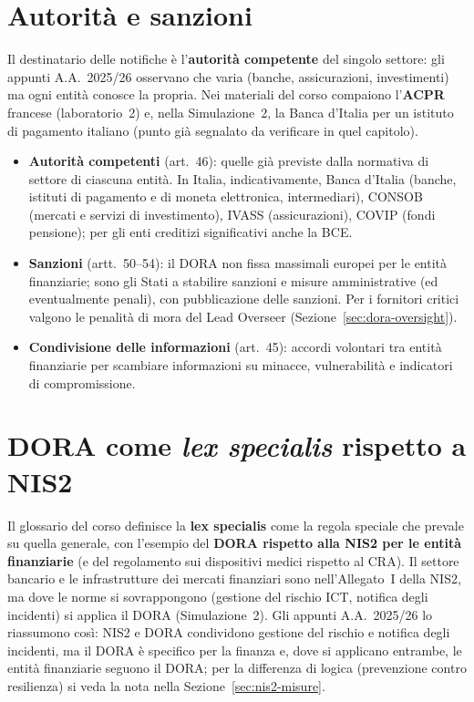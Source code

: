 \section{Autorità e sanzioni}
\label{sec:dora-autorita}

Il destinatario delle notifiche è l'\textbf{autorità competente} del singolo settore: gli appunti
A.A.~2025/26 osservano che varia (banche, assicurazioni, investimenti) ma ogni entità conosce la propria.
Nei materiali del corso compaiono l'\textbf{ACPR} francese (laboratorio~2) e, nella Simulazione~2, la
Banca d'Italia per un istituto di pagamento italiano (punto già segnalato da verificare in quel
capitolo).

\begin{integrazione}
\begin{itemize}
  \item \textbf{Autorità competenti} (art.~46): quelle già previste dalla normativa di settore di
    ciascuna entità. In Italia, indicativamente, Banca d'Italia (banche, istituti di pagamento e di
    moneta elettronica, intermediari), CONSOB (mercati e servizi di investimento), IVASS
    (assicurazioni), COVIP (fondi pensione); per gli enti creditizi significativi anche la BCE.
  \item \textbf{Sanzioni} (artt.~50--54): il DORA non fissa massimali europei per le entità
    finanziarie; sono gli Stati a stabilire sanzioni e misure amministrative (ed eventualmente penali),
    con pubblicazione delle sanzioni. Per i fornitori critici valgono le penalità di mora del Lead
    Overseer (Sezione~\ref{sec:dora-oversight}).
  \item \textbf{Condivisione delle informazioni} (art.~45): accordi volontari tra entità finanziarie
    per scambiare informazioni su minacce, vulnerabilità e indicatori di compromissione.
\end{itemize}
\end{integrazione}

\section{DORA come \emph{lex specialis} rispetto a NIS2}
\label{sec:dora-lexspecialis}

Il glossario del corso definisce la \textbf{lex specialis} come la regola speciale che prevale su quella
generale, con l'esempio del \textbf{DORA rispetto alla NIS2 per le entità finanziarie} (e del
regolamento sui dispositivi medici rispetto al CRA). Il settore bancario e le infrastrutture dei mercati
finanziari sono nell'Allegato~I della NIS2, ma dove le norme si sovrappongono (gestione del rischio
ICT, notifica degli incidenti) si applica il DORA (Simulazione~2). Gli appunti A.A.~2025/26 lo
riassumono così: NIS2 e DORA condividono gestione del rischio e notifica degli incidenti, ma il DORA è
specifico per la finanza e, dove si applicano entrambe, le entità finanziarie seguono il DORA; per la
differenza di logica (prevenzione contro resilienza) si veda la nota nella Sezione~\ref{sec:nis2-misure}.

